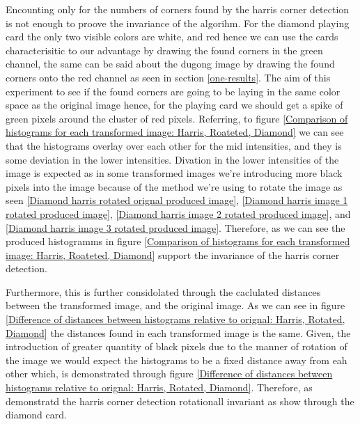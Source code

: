 \documentclass[conference]{IEEEtran}
\begin{document}
Encounting only for the numbers of corners found by the harris corner detection is not enough to proove the invariance of the algorihm. For the diamond playing card the only two visible colors are white, and red hence we can use the cards characterisitic to our advantage by drawing the found corners in the green channel, the same can be said about the dugong image by drawing the found corners onto the red channel as seen in section \ref{one-results}. The aim of this experiment to see if the found corners are going to be laying in the same color space as the original image hence, for the playing card we should get a spike of green pixels around the cluster of red pixels. Referring, to figure \ref{Comparison of histograms for each transformed image: Harris, Roateted, Diamond} we can see that the histograms overlay over each other for the mid intensities, and they is some deviation in the lower intensities. Divation in the lower intensities of the image is expected as in some transformed images we're introducing more black pixels into the image because of the method we're using to rotate the image as seen \ref{Diamond harris rotated orignal produced image}, \ref{Diamond harris image 1 rotated produced image}, \ref{Diamond harris image 2 rotated produced image}, and \ref{Diamond harris image 3 rotated produced image}. Therefore, as we can see the produced histogramms in figure \ref{Comparison of histograms for each transformed image: Harris, Roateted, Diamond} support the invariance of the harris corner detection.\par

Furthermore, this is further considolated through the caclulated distances between the transformed image, and the original image. As we can see in figure \ref{Difference of distances between histograms relative to orignal: Harris, Rotated, Diamond} the distances found in each transformed image is the same. Given, the introduction of greater quantity of black pixels due to the manner of rotation of the image we would expect the histograms to be a fixed distance away from eah other which, is demonstrated through figure \ref{Difference of distances between histograms relative to orignal: Harris, Rotated, Diamond}. Therefore, as demonstratd the harris corner detection rotationall invariant as show through the diamond card.
\end{document}
